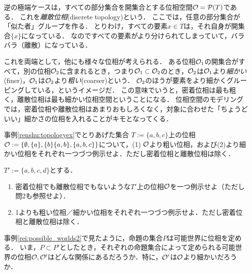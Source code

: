 \documentclass[11pt,a4paper, dvipdfmx]{jsarticle}
\begin{document}
逆の極端ケースは，すべての部分集合を開集合とする位相空間$\mathcal{O} = \mathcal{P}(T)$である．
これを\emph{離散位相}(discrete topology)という．
ここでは，任意の部分集合が「似た者」グループを作る．
とりわけ，すべての要素$x \in T$は，それ自身が開集合$\{x\}$になっている．
なのですべての要素がより分けられてしまっていて，バラバラ（離散）になっている．

これを両端として，他にも様々な位相が考えられる．
ある位相$\mathcal{O}_1$の開集合がすべて，別の位相$\mathcal{O}_2$に含まれるとき，つまり$\mathcal{O}_1 \subset \mathcal{O}_2$のとき，$\mathcal{O}_2$は$\mathcal{O}_1$より\emph{細かい}(finer)，$\mathcal{O}_1$は$\mathcal{O}_2$より\emph{粗い}(coarser)という．
$\mathcal{O}_2$のほうが要素をより細かくグルーピングしている，というイメージだ．
この意味でいうと，密着位相は最も粗く，離散位相は最も細かい位相空間ということになる．
位相空間のモデリングでは，密着位相や離散位相はあまりおもしろくなく，対象に合わせた「ちょうどいい」細かさの位相を入れることがキモとなってくる．

\begin{renshu}{}{}
事例\ref{renshu:topologyex}でとりあげた集合 $T:=\{a, b, c\}$上の位相$\mathcal{O} := \{ \emptyset, \{a \}, \{b\} \{a,b\}, \{a,b,c\} \}$について，(1) $\mathcal{O}$より粗い位相，および(2)より細かい位相をそれぞれ一つづつ例示せよ．ただし密着位相と離散位相は除く．
\end{renshu}


\begin{renshu}{}{}
$T':=\{a, b, c, d\}$とする．
\begin{enumerate}
 \item 密着位相でも離散位相でもないような$T'$上の位相$\mathcal{O}$を一つ例示せよ（ただし問2も参照せよ）．
 \item 1よりも粗い位相／細かい位相をそれぞれ一つづつ例示せよ．ただし密着位相と離散位相は除く．
\end{enumerate}
\end{renshu}


\begin{hatten}{}{}
事例\ref{rei:possible_worlds2}で見たように，命題の集合$P$は可能世界に位相を定める．
いま，$P \subset P'$としたとき，それぞれの命題集合によって定められる可能世界の位相$\mathcal{O}, \mathcal{O}'$はどんな関係にあるだろうか．特に，$\mathcal{O}'$は$\mathcal{O}$より細かいだろうか．
\end{hatten}


\end{document}
